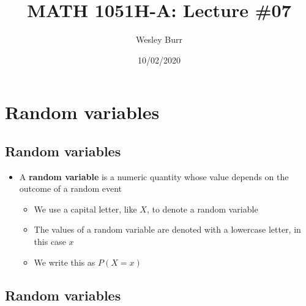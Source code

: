 \documentclass[
]{article}
\title{MATH 1051H-A: Lecture \#07}
\author{Wesley Burr}
\date{10/02/2020}
\providecommand{\tightlist}{%
  \setlength{\itemsep}{0pt}\setlength{\parskip}{0pt}}
\begin{document}
\maketitle

\hypertarget{random-variables}{%
\section{Random variables}\label{random-variables}}

\hypertarget{random-variables-1}{%
\subsection{Random variables}\label{random-variables-1}}

\begin{itemize}
\tightlist
\item
  A \textbf{random variable} is a numeric quantity whose value depends
  on the outcome of a random event

  \begin{itemize}
  \tightlist
  \item
    We use a capital letter, like \(X\), to denote a random variable
  \item
    The values of a random variable are denoted with a lowercase letter,
    in this case \(x\)
  \item
    We write this as \(P(X = x)\)
  \end{itemize}
\end{itemize}

\hypertarget{random-variables-2}{%
\subsection{Random variables}\label{random-variables-2}}
\end{document}

